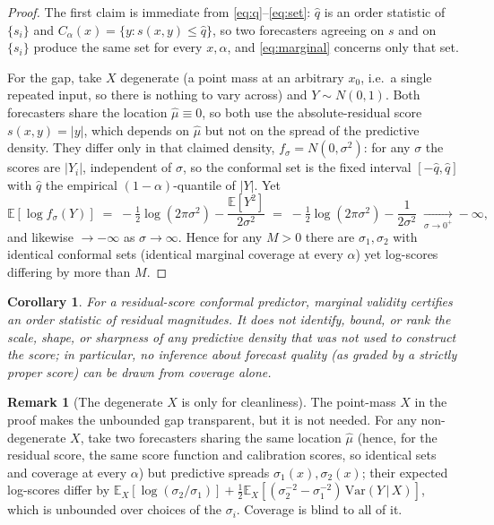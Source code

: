 \documentclass[11pt]{article}
\newtheorem{corollary}{Corollary}
\theoremstyle{definition}
\newtheorem{remark}{Remark}
\newcommand{\E}{\mathbb{E}}
\newcommand{\given}{\,\vert\,}
\begin{document}
\begin{proof}
The first claim is immediate from \eqref{eq:q}--\eqref{eq:set}: $\hat q$ is an order
statistic of $\{s_i\}$ and $C_\alpha(x)=\{y:s(x,y)\le\hat q\}$, so two forecasters
agreeing on $s$ and on $\{s_i\}$ produce the same set for every $x,\alpha$, and
\eqref{eq:marginal} concerns only that set.

For the gap, take $X$ degenerate (a point mass at an arbitrary $x_0$, i.e.\ a single
repeated input, so there is nothing to vary across) and $Y\sim N(0,1)$. Both forecasters
share the location
$\hat\mu\equiv 0$, so both use the absolute-residual score $s(x,y)=|y|$, which depends on
$\hat\mu$ but not on the spread of the predictive density. They differ only in that claimed
density, $f_\sigma=N(0,\sigma^2)$: for any $\sigma$ the scores are $|Y_i|$, independent of
$\sigma$, so the conformal set is the fixed interval $[-\hat q,\hat q]$ with $\hat q$ the
empirical $(1-\alpha)$-quantile of $|Y|$. Yet
\[
  \E[\log f_\sigma(Y)] \;=\; -\tfrac12\log(2\pi\sigma^2)-\frac{\E[Y^2]}{2\sigma^2}
  \;=\; -\tfrac12\log(2\pi\sigma^2)-\frac{1}{2\sigma^2}\;\xrightarrow[\sigma\to 0^+]{}-\infty,
\]
and likewise $\to-\infty$ as $\sigma\to\infty$. Hence for any $M>0$ there are
$\sigma_1,\sigma_2$ with identical conformal sets (identical marginal coverage at every
$\alpha$) yet log-scores differing by more than $M$.
\end{proof}

\begin{corollary}\label{cor:orth}
For a residual-score conformal predictor, marginal validity certifies an order statistic
of residual magnitudes. It does not identify, bound, or rank the scale, shape, or
sharpness of any predictive density that was not used to construct the score; in
particular, no inference about forecast quality (as graded by a strictly proper score)
can be drawn from coverage alone.
\end{corollary}

\begin{remark}[The degenerate $X$ is only for cleanliness]\label{rem:nondeg}
The point-mass $X$ in the proof makes the unbounded gap transparent, but it is not needed.
For any non-degenerate $X$, take two forecasters sharing the same location $\hat\mu$ (hence,
for the residual score, the same score function and calibration scores, so identical sets
and coverage at every $\alpha$) but predictive spreads $\sigma_1(x),\sigma_2(x)$; their
expected log-scores differ by $\E_X[\log(\sigma_2/\sigma_1)] + \tfrac12\E_X[(\sigma_2^{-2}
-\sigma_1^{-2})\,\mathrm{Var}(Y\given X)]$, which is unbounded over choices of the
$\sigma_i$. Coverage is blind to all of it.
\end{remark}
\end{document}
